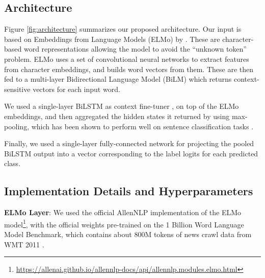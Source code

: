 \documentclass[11pt,a4paper]{article}
\begin{document}

\subsection{Architecture}

Figure \ref{fig:architecture} summarizes our proposed architecture. Our input is
based on Embeddings from Language Models (ELMo) by \citet{peters2018deep}. These
are character-based word representations allowing the model to avoid the
``unknown token'' problem. ELMo uses a set of convolutional neural networks to
extract features from character embeddings, and builds word vectors from them.
These are then fed to a multi-layer Bidirectional Language Model (BiLM) which
returns context-sensitive vectors for each input word. 

We used a single-layer BiLSTM as context fine-tuner \cite{graves2005framewise,
graves2013speech}, on top of the ELMo embeddings, and then aggregated the hidden
states it returned by using max-pooling, which has been shown to perform well on
sentence classification tasks \cite{conneau2017supervised}.

Finally, we used a single-layer fully-connected network for projecting the
pooled BiLSTM output into a vector corresponding to the label logits for each
predicted class.

\subsection{Implementation Details and Hyperparameters}

\hspace{\parindent} \textbf{ELMo Layer}: We used the official AllenNLP
implementation of the ELMo
model\footnote{\tiny\url{https://allenai.github.io/allennlp-docs/api/allennlp.modules.elmo.html}},
with the official weights pre-trained on the 1 Billion Word Language Model
Benchmark, which contains about 800M tokens of news crawl data from WMT 2011
\cite{Chelba2014}.
\end{document}
